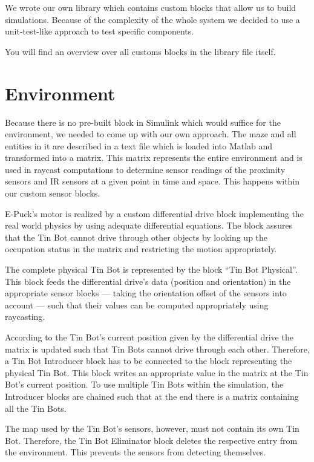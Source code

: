 \documentclass[a4paper,parskip,headheight=38pt]{scrartcl} %
\begin{document}
We wrote our own library which contains custom blocks that allow us to build simulations. Because of the complexity of the whole system we decided to use a unit-test-like approach to test specific components.

You will find an overview over all customs blocks in the library file itself.


\section{Environment}
Because there is no pre-built block in Simulink which would suffice for the environment, we needed to come up with our own approach. The maze and all entities in it are described in a text file which is loaded into Matlab and transformed into a matrix. This matrix represents the entire environment and is used in raycast computations to determine sensor readings of the proximity sensors and IR sensors at a given point in time and space. This happens within our custom sensor blocks.

E-Puck's motor is realized by a custom differential drive block implementing the real world physics by using adequate differential equations. The block assures that the Tin Bot cannot drive through other objects by looking up the occupation status in the matrix and restricting the motion appropriately.

The complete physical Tin Bot is represented by the block \enquote{Tin Bot Physical}. This block feeds the differential drive's data (position and orientation) in the appropriate sensor blocks — taking the orientation offset of the sensors into account — such that their values can be computed appropriately using raycasting.

According to the Tin Bot's current position given by the differential drive the matrix is updated such that Tin Bots cannot drive through each other. Therefore, a Tin Bot Introducer block has to be connected to the block representing the physical Tin Bot. This block writes an appropriate value in the matrix at the Tin Bot's current position. To use multiple Tin Bots within the simulation, the Introducer blocks are chained such that at the end there is a matrix containing all the Tin Bots.

The map used by the Tin Bot's sensors, however, must not contain its own Tin Bot. Therefore, the Tin Bot Eliminator block deletes the respective entry from the environment. This prevents the sensors from detecting themselves.
\end{document}

